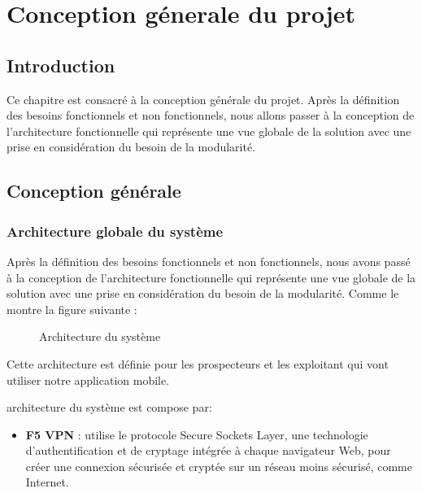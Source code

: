 \chapter{Conception g\'enerale du projet}

\section{Introduction}
Ce chapitre est consacr\'e \`a la conception g\'en\'erale du projet. Apr\`es la d\'efinition des besoins fonctionnels et non fonctionnels, nous allons passer \`a la conception de l'architecture fonctionnelle qui repr\'esente une vue globale de la solution avec une prise en consid\'eration du besoin de la modularit\'e. 

\section{Conception g\'en\'erale}


\subsection{Architecture globale du syst\`eme}

Apr\`es la d\'efinition des besoins fonctionnels et non fonctionnels, nous avons pass\'e \`a la conception de l'architecture fonctionnelle qui repr\'esente une vue globale de la solution avec une prise en consid\'eration du besoin de la modularit\'e. Comme le montre la figure suivante :

\begin{figure}[H]
	\caption{\label{fig:my-label} Architecture du syst\`eme}
\end{figure}

Cette architecture est d\'efinie pour les prospecteurs et les exploitant qui vont utiliser notre application mobile.

architecture du syst\`eme est compose par:
\begin{itemize}
\item \textbf{F5 VPN} : utilise le protocole Secure Sockets Layer, une technologie d'authentification et de cryptage int\'egr\'ee \`a chaque navigateur Web, pour cr\'eer une connexion s\'ecuris\'ee et crypt\'ee sur un r\'eseau moins s\'ecuris\'e, comme Internet.
\end{itemize}

